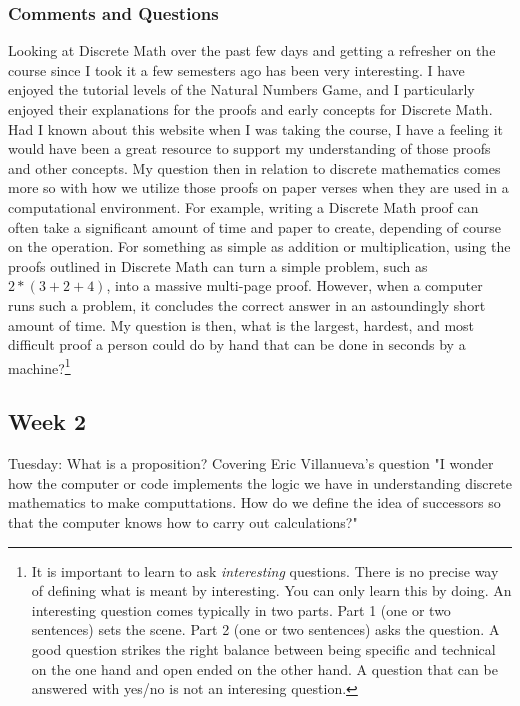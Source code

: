 \documentclass{article}
\theoremstyle{theorem}
\theoremstyle{definition}
\theoremstyle{remark}
\begin{document}
\subsubsection{Comments and Questions}
  Looking at Discrete Math over the past few days and getting a refresher on the course since I took it a few semesters ago has been very interesting. I have enjoyed the tutorial levels of the Natural Numbers Game, and I particularly enjoyed their explanations for the proofs and early concepts for Discrete Math. Had I known about this website when I was taking the course, I have a feeling it would have been a great resource to support my understanding of those proofs and other concepts. 
  \newline My question then in relation to discrete mathematics comes more so with how we utilize those proofs on paper verses when they are used in a computational environment. For example, writing a Discrete Math proof can often take a significant amount of time and paper to create, depending of course on the operation. For something as simple as addition or multiplication, using the proofs outlined in Discrete Math can turn a simple problem, such as $2*(3+2+4)$, into a massive multi-page proof. However, when a computer runs such a problem, it concludes the correct answer in an astoundingly short amount of time.
  \newline My question is then, what is the largest, hardest, and most difficult proof a person could do by hand that can be done in seconds by a machine?\footnote{It is important to learn to ask \emph{interesting} questions. There is no precise way of defining what is meant by interesting. You can only learn this by doing. An interesting question comes typically in two parts. Part 1 (one or two sentences) sets the scene. Part 2 (one or two sentences) asks the question. A good question strikes the right balance between being specific and technical on the one hand and open ended on the other hand. A question that can be answered with yes/no is not an interesing question.}

\subsection{Week 2}
  Tuesday: What is a proposition? Covering Eric Villanueva's question "I wonder how the computer or code implements the logic we have in understanding discrete mathematics to make computtations. How do we define the idea of successors so that the computer knows how to carry out calculations?"
\end{document}
